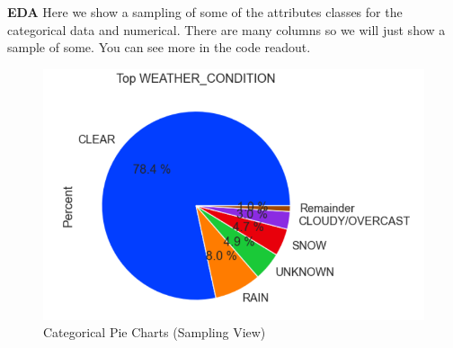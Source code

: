 \documentclass[conference]{IEEEtran}
\begin{document}
\textbf{EDA} \linebreak
Here we show a sampling of some of the attributes classes for the categorical data and numerical.  There are many columns so we will just show a sample of some. You can see more in the code readout. 
\begin{figure}[!h]
	\includegraphics[width=\linewidth]{TOP_WEATHER_CONDITION_PIE.png}
	\caption{Categorical Pie Charts (Sampling View)}
	\label{fig: Top_Weather_Condition Pie chart}
 \end{figure}

 
\end{document}

